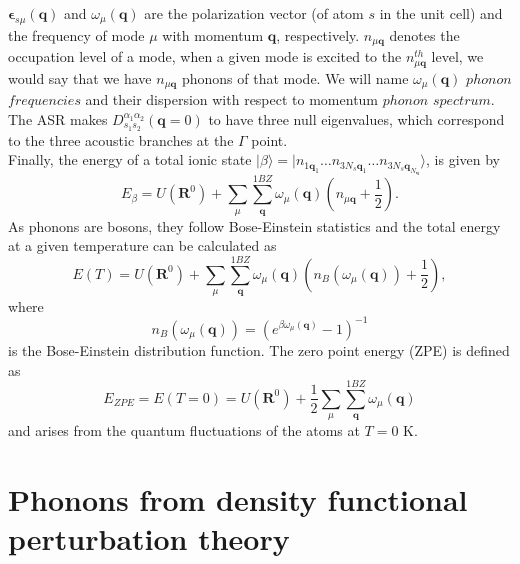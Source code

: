 $\boldsymbol{\epsilon}_{s\mu}(\mathbf{q})$ and $\omega_{\mu}(\mathbf{q})$ are the polarization vector (of atom $s$ in the unit cell) and the frequency of mode $\mu$ with 
momentum $\mathbf{q}$, respectively. $n_{\mu\mathbf{q}}$ denotes the occupation level of a mode, when a given mode is excited to the $n^{th}_{\mu\mathbf{q}}$ level, we would say that we have $n_{\mu\mathbf{q}}$ 
phonons of that mode. We will name $\omega_{\mu}(\mathbf{q})$ $phonon$ $frequencies$ and their dispersion with respect to momentum $phonon$ $spectrum$. The ASR makes $D_{s_{1}s_{2}}^{\alpha_{1}\alpha_{2}}(\mathbf{q}=0)$ to have three null eigenvalues, which correspond to the three acoustic branches at the $\Gamma$ point. \\

Finally, the energy of a total ionic state $|\beta\rangle=|n_{1\mathbf{q}_{1}}\dots n_{3N_{s}\mathbf{q}_{1}}\dots n_{3N_{s}\mathbf{q}_{N_{\mathbf{q}}}}\rangle$, is given by
\begin{equation}
 E_{\beta}=U(\mathbf{R}^{0})+\sum_{\mu}\sum_{\mathbf{q}}^{1BZ}\omega_{\mu}(\mathbf{q})\left(n_{\mu\mathbf{q}}+\frac{1}{2}\right).
\end{equation}
As phonons are bosons, they follow Bose-Einstein statistics and the total energy at a given temperature can be calculated as
\begin{equation}
 E(T)=U(\mathbf{R}^{0})+\sum_{\mu}\sum_{\mathbf{q}}^{1BZ}\omega_{\mu}(\mathbf{q})\left(n_{B}(\omega_{\mu}(\mathbf{q}))+\frac{1}{2}\right),
\end{equation}
where 
\begin{equation}
 n_{B}(\omega_{\mu}(\mathbf{q}))=(e^{\beta\omega_{\mu}(\mathbf{q})}-1)^{-1}
\end{equation}
is the Bose-Einstein distribution function. The zero point energy (ZPE) is defined as
\begin{equation}
 E_{ZPE}=E(T=0)=U(\mathbf{R}^{0})+\frac{1}{2}\sum_{\mu}\sum_{\mathbf{q}}^{1BZ}\omega_{\mu}(\mathbf{q})
\end{equation}
and arises from the quantum fluctuations of the atoms at $T=0$ K.

\section{Phonons from density functional perturbation theory}
\label{dfpt-2bfc}

